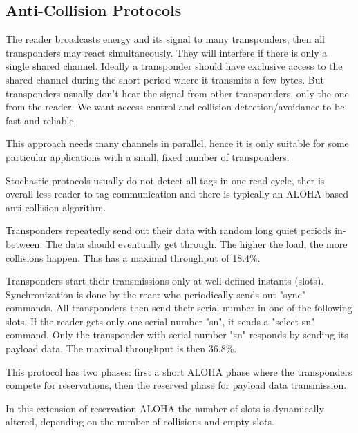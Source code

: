 \subsection{Anti-Collision Protocols}
\begin{mytitle} The reader broadcasts energy and its signal to many transponders, then all transponders may react simultaneously. They will interfere if there is only a single shared channel. Ideally a transponder should have exclusive access to the shared channel during the short period where it transmits a few bytes. But transponders usually don't hear the signal from other transponders, only the one from the reader. We want access control and collision detection/avoidance to be fast and reliable.
\end{mytitle}
\begin{mytitle} This approach needs many channels in parallel, hence it is only suitable for some particular applications with a small, fixed number of transponders.
\end{mytitle}
\begin{mytitle} Stochastic protocols usually do not detect all tags in one read cycle, ther is overall less reader to tag communication and there is typically an ALOHA-based anti-collision algorithm.
    \begin{mysubtitle} Transponders repeatedly send out their data with random long quiet periods in-between. The data should eventually get through. The higher the load, the more collisions happen. This has a maximal throughput of 18.4\%.
    \end{mysubtitle}
    \begin{mysubtitle} Transponders start their transmissions only at well-defined instants (slots). Synchronization is done by the reaer who periodically sends out "sync" commands. All transponders then send their serial number in one of the following slots. If the reader gets only one serial number "sn", it sends a "select sn" command. Only the transponder with serial number "sn" responds by sending its payload data. The maximal throughput is then 36.8\%. 
    \end{mysubtitle}
    \begin{mysubtitle} This protocol has two phases: first a short ALOHA phase where the transponders compete for reservations, then the reserved phase for payload data transmission. 
    \end{mysubtitle}
    \begin{mysubtitle} In this extension of reservation ALOHA the number of slots is dynamically altered, depending on the number of collisions and empty slots.
    \end{mysubtitle}
\end{mytitle}
